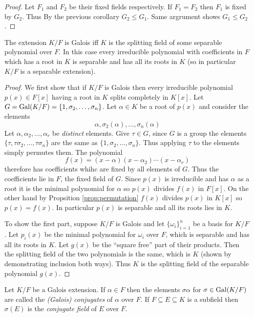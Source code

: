 \documentclass[a4paper]{article}
\begin{document}
\begin{proof}
  Let $F_1$ and $F_2$ be their fixed fields respectively. If $F_1 = F_2$ then $F_1$ is fixed by $G_2$. Thus By the previous corollary $G_2 \leq G_1$. Same argrument shows $G_1 \leq G_2$.
\end{proof}

\begin{theorem}
  \label{thm:characterisation of galois extension}
  The extension $K/F$ is Galois iff $K$ is the splitting field of some separable polynomial over $F$. In this case every irreducible polynomial with coefficients in $F$ which has a root in $K$ is separable and has all its roots in $K$ (so in particular $K/F$ is a separable extension).
\end{theorem}

\begin{proof}
  We first show that if $K/F$ is Galois then every irreducible polynomial $p(x) \in F[x]$ having a root in $K$ splits completely in $K[x]$. Let $G = \operatorname{Gal}(K/F) = \{1, \sigma_2,\ldots,\sigma_n\}$. Let $\alpha \in K$ be a root of $p(x)$ and consider the elements
  \[ \alpha, \sigma_2(\alpha),\ldots, \sigma_n(\alpha) \]
  Let $\alpha, \alpha_2,\ldots,\alpha_r$ be \emph{distinct} elements. Give $\tau \in G$, since $G$ is a group the elements $\{\tau, \tau\sigma_2,\ldots,\tau\sigma_n\}$ are the same as $\{1,\sigma_2,\ldots,\sigma_n\}$. Thus applying $\tau$ to the elements simply permutes them. The polynomial
  \[ f(x) = (x-\alpha) (x-\alpha_2)\cdots (x-\alpha_r) \]
  therefore has coefficients whihc are fixed by all elements of $G$. Thus the coefficients lie in $F$, the fixed field of $G$. Since $p(x)$ is irreducible and has $\alpha$ as a root it is the minimal polynomial for $\alpha$ so $p(x)$ divides $f(x)$ in $F[x]$. On the other hand by Propsition \ref{prop:permutation} $f(x)$ divides $p(x)$ in $K[x]$ so $p(x) = f(x)$. In particular $p(x)$ is separable and all its roots lies in $K$.

  To show the first part, suppose $K/F$ is Galois and let $\{\omega_i\}_{i=1}^n$ be a basis for $K/F$. Let $p_i(x)$ be the minimal polynomial for $\omega_i$ over $F$, which is separable and has all its roots in $K$. Let $g(x)$ be the ``square free'' part of their products. Then the splitting field of the two polynomials is the same, which is $K$ (shown by demonstrating inclusion both ways). Thus $K$ is the splitting field of the separable polynomial $g(x)$.
\end{proof}

\begin{definition}
  Let $K/F$ be a Galois extension. If $\alpha \in F$ then the elements $\sigma\alpha$ for $\sigma \in \operatorname{Gal}(K/F)$ are called the \emph{(Galois) conjugates} of $\alpha$ over $F$. If $F \subseteq E \subseteq K$ is a subfield then $\sigma(E)$ is the \emph{conjugate field} of $E$ over $F$.
\end{definition}
\end{document}
